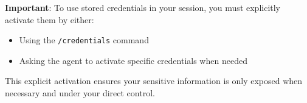 \textbf{Important}: To use stored credentials in your session, you must explicitly activate them by either:
\begin{itemize}
    \item Using the \texttt{/credentials} command
    \item Asking the agent to activate specific credentials when needed
\end{itemize}

This explicit activation ensures your sensitive information is only exposed when necessary and under your direct control.